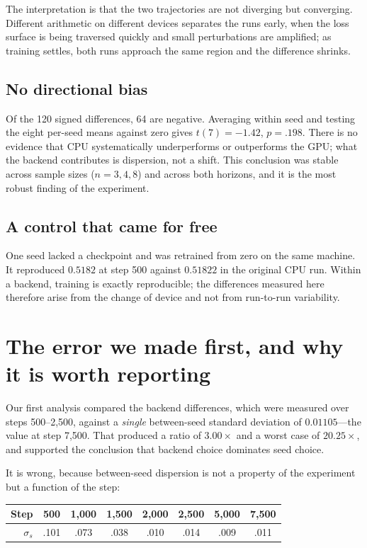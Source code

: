 \documentclass[jou,11pt,donotrepeattitle]{apa7}
\begin{document}
The interpretation is that the two trajectories are not diverging but converging. Different
arithmetic on different devices separates the runs early, when the loss surface is being
traversed quickly and small perturbations are amplified; as training settles, both runs approach
the same region and the difference shrinks.

\subsection{No directional bias}

Of the 120 signed differences, 64 are negative. Averaging within seed and testing the eight
per-seed means against zero gives $t(7) = -1.42$, $p = .198$. There is no evidence that CPU
systematically underperforms or outperforms the GPU; what the backend contributes is dispersion,
not a shift. This conclusion was stable across sample sizes ($n = 3, 4, 8$) and across both
horizons, and it is the most robust finding of the experiment.

\subsection{A control that came for free}

One seed lacked a checkpoint and was retrained from zero on the same machine. It reproduced
$0.5182$ at step 500 against $0.51822$ in the original CPU run. Within a backend, training is
exactly reproducible; the differences measured here therefore arise from the change of device
and not from run-to-run variability.

\section{The error we made first, and why it is worth reporting}

Our first analysis compared the backend differences, which were measured over steps 500--2{,}500,
against a \emph{single} between-seed standard deviation of $0.01105$---the value at step 7{,}500.
That produced a ratio of $3.00\times$ and a worst case of $20.25\times$, and supported the
conclusion that backend choice dominates seed choice.

It is wrong, because between-seed dispersion is not a property of the experiment but a function
of the step:

\begin{center}
\small
\begin{tabular}{rccccccc}
\toprule
Step & 500 & 1{,}000 & 1{,}500 & 2{,}000 & 2{,}500 & 5{,}000 & 7{,}500 \\
\midrule
$\sigma_s$ & .101 & .073 & .038 & .010 & .014 & .009 & .011 \\
\bottomrule
\end{tabular}
\end{center}
\end{document}
